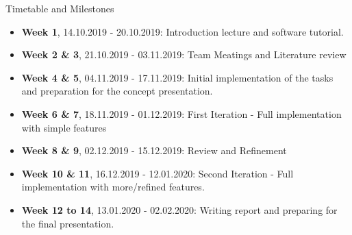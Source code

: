 \documentclass[shortpres]{beamer}
\begin{document}
\begin{frame}{Timetable and Milestones}	

\begin{itemize} 
\item \textbf{Week 1}, 14.10.2019 - 20.10.2019: Introduction lecture and software tutorial.
\vfill \item  \textbf{Week 2 \& 3}, 21.10.2019 - 03.11.2019: Team Meatings and Literature review
\vfill \item  \textbf{Week 4 \& 5}, 04.11.2019 - 17.11.2019: Initial implementation of the tasks and preparation for the concept presentation.
\vfill \item  \textbf{Week 6 \& 7}, 18.11.2019 - 01.12.2019: First Iteration - Full implementation with simple features
\vfill \item  \textbf{Week 8 \& 9}, 02.12.2019 - 15.12.2019: Review and Refinement
\vfill \item  \textbf{Week 10 \& 11}, 16.12.2019 - 12.01.2020: Second Iteration - Full implementation with more/refined features.
\vfill \item  \textbf{Week 12 to 14}, 13.01.2020 - 02.02.2020: Writing report and preparing for the final presentation.
\end{itemize}

\end{frame}
\end{document}
